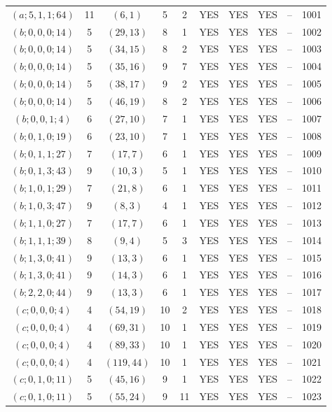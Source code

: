 \begin{longtable}{|c|c|c|c|c|c|c|c|c|c|}
$(a; 5, 1, 1; 64)$ & 11 & $(6, 1)$ & 5 & 2 & YES & YES & YES & -- & 1001\\
$(b; 0, 0, 0; 14)$ & 5 & $(29, 13)$ & 8 & 1 & YES & YES & YES & -- & 1002\\
$(b; 0, 0, 0; 14)$ & 5 & $(34, 15)$ & 8 & 2 & YES & YES & YES & -- & 1003\\
$(b; 0, 0, 0; 14)$ & 5 & $(35, 16)$ & 9 & 7 & YES & YES & YES & -- & 1004\\
$(b; 0, 0, 0; 14)$ & 5 & $(38, 17)$ & 9 & 2 & YES & YES & YES & -- & 1005\\
$(b; 0, 0, 0; 14)$ & 5 & $(46, 19)$ & 8 & 2 & YES & YES & YES & -- & 1006\\
$(b; 0, 0, 1; 4)$ & 6 & $(27, 10)$ & 7 & 1 & YES & YES & YES & -- & 1007\\
$(b; 0, 1, 0; 19)$ & 6 & $(23, 10)$ & 7 & 1 & YES & YES & YES & -- & 1008\\
$(b; 0, 1, 1; 27)$ & 7 & $(17, 7)$ & 6 & 1 & YES & YES & YES & -- & 1009\\
$(b; 0, 1, 3; 43)$ & 9 & $(10, 3)$ & 5 & 1 & YES & YES & YES & -- & 1010\\
$(b; 1, 0, 1; 29)$ & 7 & $(21, 8)$ & 6 & 1 & YES & YES & YES & -- & 1011\\
$(b; 1, 0, 3; 47)$ & 9 & $(8, 3)$ & 4 & 1 & YES & YES & YES & -- & 1012\\
$(b; 1, 1, 0; 27)$ & 7 & $(17, 7)$ & 6 & 1 & YES & YES & YES & -- & 1013\\
$(b; 1, 1, 1; 39)$ & 8 & $(9, 4)$ & 5 & 3 & YES & YES & YES & -- & 1014\\
$(b; 1, 3, 0; 41)$ & 9 & $(13, 3)$ & 6 & 1 & YES & YES & YES & -- & 1015\\
$(b; 1, 3, 0; 41)$ & 9 & $(14, 3)$ & 6 & 1 & YES & YES & YES & -- & 1016\\
$(b; 2, 2, 0; 44)$ & 9 & $(13, 3)$ & 6 & 1 & YES & YES & YES & -- & 1017\\
$(c; 0, 0, 0; 4)$ & 4 & $(54, 19)$ & 10 & 2 & YES & YES & YES & -- & 1018\\
$(c; 0, 0, 0; 4)$ & 4 & $(69, 31)$ & 10 & 1 & YES & YES & YES & -- & 1019\\
$(c; 0, 0, 0; 4)$ & 4 & $(89, 33)$ & 10 & 1 & YES & YES & YES & -- & 1020\\
$(c; 0, 0, 0; 4)$ & 4 & $(119, 44)$ & 10 & 1 & YES & YES & YES & -- & 1021\\
$(c; 0, 1, 0; 11)$ & 5 & $(45, 16)$ & 9 & 1 & YES & YES & YES & -- & 1022\\
$(c; 0, 1, 0; 11)$ & 5 & $(55, 24)$ & 9 & 11 & YES & YES & YES & -- & 1023\\

\end{longtable}
